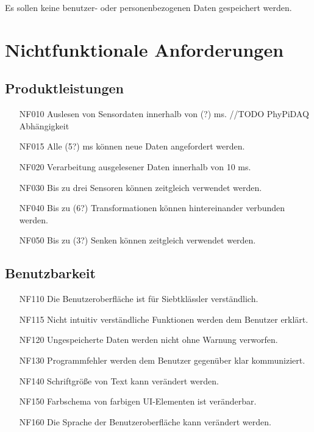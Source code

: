 \documentclass[parskip=full]{scrartcl}
\begin{document}
Es sollen keine benutzer- oder personenbezogenen Daten gespeichert werden.

\section{Nichtfunktionale Anforderungen}\label{nichtfunktionale}

\subsection{Produktleistungen}

\begin{itemize}

\item[NF010] Auslesen von Sensordaten innerhalb von (?) ms. //TODO PhyPiDAQ Abhängigkeit
\item[NF015] Alle (5?) ms können neue Daten angefordert werden.
\item[NF020] Verarbeitung ausgelesener Daten innerhalb von 10 ms.
\item[NF030] Bis zu drei Sensoren können zeitgleich verwendet werden.
\item[NF040] Bis zu (6?) Transformationen können hintereinander verbunden werden.
\item[NF050] Bis zu (3?) Senken können zeitgleich verwendet werden.

\end{itemize}

\subsection{Benutzbarkeit}

\begin{itemize}

\item[NF110] Die Benutzeroberfläche ist für Siebtklässler verständlich.
\item[NF115] Nicht intuitiv verständliche Funktionen werden dem Benutzer erklärt.
\item[NF120] Ungespeicherte Daten werden nicht ohne Warnung verworfen.
\item[NF130] Programmfehler werden dem Benutzer gegenüber klar kommuniziert.
\item[NF140] Schriftgröße von Text kann verändert werden.
\item[NF150] Farbschema von farbigen UI-Elementen ist veränderbar.
\item[NF160] Die Sprache der Benutzeroberfläche kann verändert werden.

\end{itemize}
\end{document}
